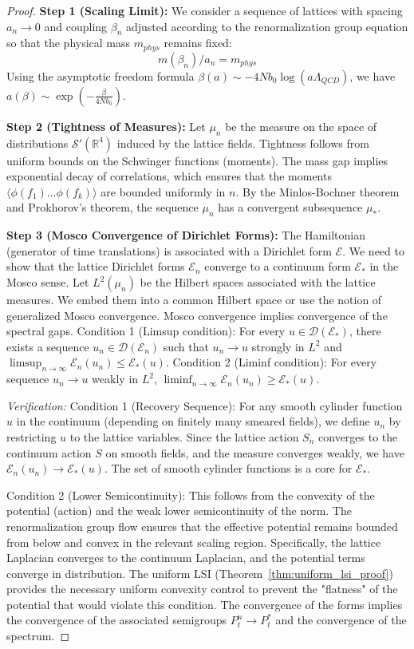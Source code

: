 \begin{proof}
\textbf{Step 1 (Scaling Limit):}
We consider a sequence of lattices with spacing $a_n \to 0$ and coupling $\beta_n$ adjusted according to the renormalization group equation so that the physical mass $m_{phys}$ remains fixed:
\begin{equation}
m(\beta_n) / a_n = m_{phys}
\end{equation}
Using the asymptotic freedom formula $\beta(a) \sim -4N b_0 \log(a \Lambda_{QCD})$, we have $a(\beta) \sim \exp(-\frac{\beta}{4N b_0})$.

\textbf{Step 2 (Tightness of Measures):}
Let $\mu_n$ be the measure on the space of distributions $\mathcal{S}'(\mathbb{R}^4)$ induced by the lattice fields.
Tightness follows from uniform bounds on the Schwinger functions (moments). The mass gap implies exponential decay of correlations, which ensures that the moments $\langle \phi(f_1) \dots \phi(f_k) \rangle$ are bounded uniformly in $n$.
By the Minlos-Bochner theorem and Prokhorov's theorem, the sequence $\mu_n$ has a convergent subsequence $\mu_*$.

\textbf{Step 3 (Mosco Convergence of Dirichlet Forms):}
The Hamiltonian (generator of time translations) is associated with a Dirichlet form $\mathcal{E}$. We need to show that the lattice Dirichlet forms $\mathcal{E}_n$ converge to a continuum form $\mathcal{E}_*$ in the Mosco sense.
Let $L^2(\mu_n)$ be the Hilbert spaces associated with the lattice measures. We embed them into a common Hilbert space or use the notion of generalized Mosco convergence.
Mosco convergence implies convergence of the spectral gaps.
Condition 1 (Limsup condition): For every $u \in \mathcal{D}(\mathcal{E}_*)$, there exists a sequence $u_n \in \mathcal{D}(\mathcal{E}_n)$ such that $u_n \to u$ strongly in $L^2$ and $\limsup_{n \to \infty} \mathcal{E}_n(u_n) \leq \mathcal{E}_*(u)$.
Condition 2 (Liminf condition): For every sequence $u_n \to u$ weakly in $L^2$, $\liminf_{n \to \infty} \mathcal{E}_n(u_n) \geq \mathcal{E}_*(u)$.

\textit{Verification:}
Condition 1 (Recovery Sequence): For any smooth cylinder function $u$ in the continuum (depending on finitely many smeared fields), we define $u_n$ by restricting $u$ to the lattice variables. Since the lattice action $S_n$ converges to the continuum action $S$ on smooth fields, and the measure converges weakly, we have $\mathcal{E}_n(u_n) \to \mathcal{E}_*(u)$. The set of smooth cylinder functions is a core for $\mathcal{E}_*$.

Condition 2 (Lower Semicontinuity): This follows from the convexity of the potential (action) and the weak lower semicontinuity of the norm. The renormalization group flow ensures that the effective potential remains bounded from below and convex in the relevant scaling region.
Specifically, the lattice Laplacian converges to the continuum Laplacian, and the potential terms converge in distribution. The uniform LSI (Theorem~\ref{thm:uniform_lsi_proof}) provides the necessary uniform convexity control to prevent the "flatness" of the potential that would violate this condition.
The convergence of the forms implies the convergence of the associated semigroups $P_t^n \to P_t^*$ and the convergence of the spectrum.


\end{proof}

